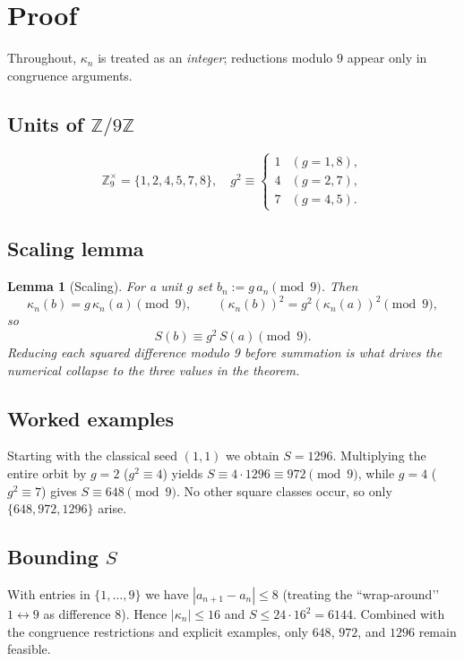 \documentclass[12pt]{article}
\newtheorem{lem}{Lemma}
\begin{document}
\section{Proof}

Throughout, $\kappa_n$ is treated as an \emph{integer}; reductions modulo $9$
appear only in congruence arguments.

\subsection[Units of Z9]{Units of $\mathbb Z/9\mathbb Z$}

\[
\mathbb Z_9^{\times}=\{1,2,4,5,7,8\},\quad
g^{2}\equiv
\begin{cases}
1&(g=1,8),\\
4&(g=2,7),\\
7&(g=4,5).
\end{cases}
\]

\subsection{Scaling lemma}

\begin{lem}[Scaling]
For a unit $g$ set $b_n:=g\,a_n\pmod9$.  Then
\[
\kappa_n(b)=g\,\kappa_n(a)\pmod9,\qquad
(\kappa_n(b))^{2}=g^{2}(\kappa_n(a))^{2}\pmod9,
\]
so
\[
S(b)\equiv g^{2}\,S(a)\pmod9.
\]
Reducing each squared difference modulo 9 \emph{before} summation is what drives
the numerical collapse to the three values in the theorem.
\end{lem}

\subsection{Worked examples}

Starting with the classical seed $(1,1)$ we obtain $S=1296$.
Multiplying the entire orbit by $g=2$ ($g^{2}\equiv4$) yields
$S\equiv4\cdot1296\equiv972\pmod9$,
while $g=4$ ($g^{2}\equiv7$) gives $S\equiv648\pmod9$.
No other square classes occur, so only $\{648,972,1296\}$ arise.

\subsection[Bounding S]{Bounding $S$}

With entries in $\{1,\dots,9\}$ we have $|a_{n+1}-a_n|\le8$ (treating the
``wrap-around’’ $1\leftrightarrow9$ as difference 8).  Hence
$|\kappa_n|\le16$ and
\(S\le24\cdot16^{2}=6144\).
Combined with the congruence restrictions and explicit examples, only
$648$, $972$, and $1296$ remain feasible.
\end{document}
